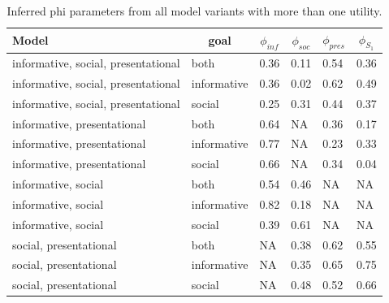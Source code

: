 \documentclass[floatsintext,man]{apa6}
\theoremstyle{definition}
\theoremstyle{definition}
\theoremstyle{definition}
\theoremstyle{remark}
\begin{document}
\begin{table}[tbp]
\begin{center}
\begin{threeparttable}
\caption{\label{tab:phi}Inferred phi parameters from all model variants with more than one utility.}
\begin{tabular}{llllll}
\toprule
Model & \multicolumn{1}{c}{goal} & \multicolumn{1}{c}{$\phi_{inf}$} & \multicolumn{1}{c}{$\phi_{soc}$} & \multicolumn{1}{c}{$\phi_{pres}$} & \multicolumn{1}{c}{$\phi_{S_1}$}\\
\midrule
informative, social, presentational & both & 0.36 & 0.11 & 0.54 & 0.36\\
informative, social, presentational & informative & 0.36 & 0.02 & 0.62 & 0.49\\
informative, social, presentational & social & 0.25 & 0.31 & 0.44 & 0.37\\
informative, presentational & both & 0.64 & NA & 0.36 & 0.17\\
informative, presentational & informative & 0.77 & NA & 0.23 & 0.33\\
informative, presentational & social & 0.66 & NA & 0.34 & 0.04\\
informative, social & both & 0.54 & 0.46 & NA & NA\\
informative, social & informative & 0.82 & 0.18 & NA & NA\\
informative, social & social & 0.39 & 0.61 & NA & NA\\
social, presentational & both & NA & 0.38 & 0.62 & 0.55\\
social, presentational & informative & NA & 0.35 & 0.65 & 0.75\\
social, presentational & social & NA & 0.48 & 0.52 & 0.66\\
\bottomrule
\end{tabular}
\end{threeparttable}
\end{center}
\end{table}
\end{document}
